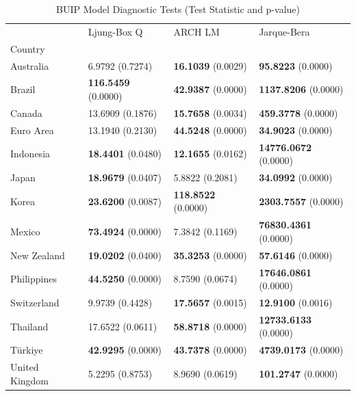 \begin{table}
\caption{BUIP Model Diagnostic Tests (Test Statistic and p-value)}
\label{tab:buip_diagnostics}
\begin{tabular}{llll}
\toprule
 & Ljung-Box Q & ARCH LM & Jarque-Bera \\
Country &  &  &  \\
\midrule
Australia & 6.9792 (0.7274) & \textbf{16.1039} (0.0029) & \textbf{95.8223} (0.0000) \\
Brazil & \textbf{116.5459} (0.0000) & \textbf{42.9387} (0.0000) & \textbf{1137.8206} (0.0000) \\
Canada & 13.6909 (0.1876) & \textbf{15.7658} (0.0034) & \textbf{459.3778} (0.0000) \\
Euro Area & 13.1940 (0.2130) & \textbf{44.5248} (0.0000) & \textbf{34.9023} (0.0000) \\
Indonesia & \textbf{18.4401} (0.0480) & \textbf{12.1655} (0.0162) & \textbf{14776.0672} (0.0000) \\
Japan & \textbf{18.9679} (0.0407) & 5.8822 (0.2081) & \textbf{34.0992} (0.0000) \\
Korea & \textbf{23.6200} (0.0087) & \textbf{118.8522} (0.0000) & \textbf{2303.7557} (0.0000) \\
Mexico & \textbf{73.4924} (0.0000) & 7.3842 (0.1169) & \textbf{76830.4361} (0.0000) \\
New Zealand & \textbf{19.0202} (0.0400) & \textbf{35.3253} (0.0000) & \textbf{57.6146} (0.0000) \\
Philippines & \textbf{44.5250} (0.0000) & 8.7590 (0.0674) & \textbf{17646.0861} (0.0000) \\
Switzerland & 9.9739 (0.4428) & \textbf{17.5657} (0.0015) & \textbf{12.9100} (0.0016) \\
Thailand & 17.6522 (0.0611) & \textbf{58.8718} (0.0000) & \textbf{12733.6133} (0.0000) \\
Türkiye & \textbf{42.9295} (0.0000) & \textbf{43.7378} (0.0000) & \textbf{4739.0173} (0.0000) \\
United Kingdom & 5.2295 (0.8753) & 8.9690 (0.0619) & \textbf{101.2747} (0.0000) \\
\bottomrule
\end{tabular}
\end{table}
